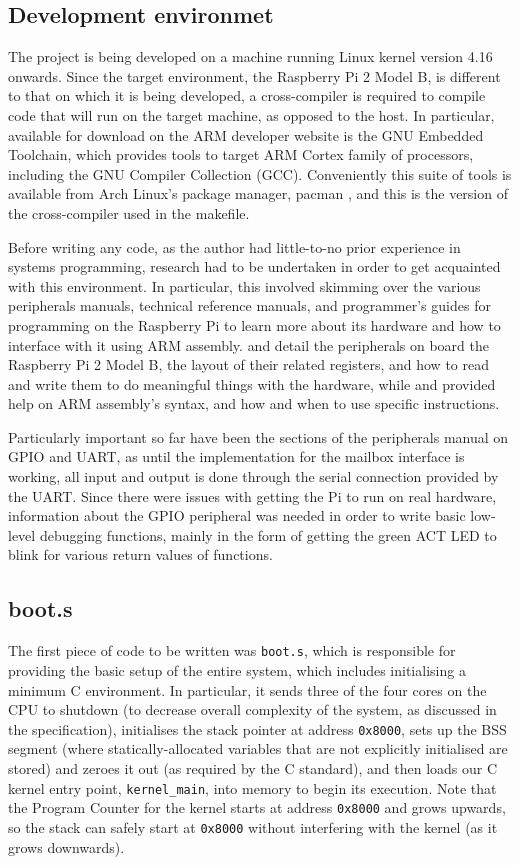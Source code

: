 \documentclass[10pt,a4paper]{article}
\newcommand{\code}[1]{\texttt{#1}}
\begin{document}
\subsection{Development environmet}
The project is being developed on a machine running Linux kernel version 4.16
onwards. Since the target environment, the Raspberry Pi 2 Model B, is different
to that on which it is being developed, a cross-compiler is required to compile
code that will run on the target machine, as opposed to the host. In particular,
available for download on the ARM developer website \cite{GNUtoolchain} is the
GNU Embedded Toolchain, which provides tools to target ARM Cortex family of
processors, including the GNU Compiler Collection (GCC). Conveniently this suite
of tools is available from Arch Linux's package manager, pacman \cite{pacman},
and this is the version of the cross-compiler used in the makefile.

Before writing any code, as the author had little-to-no prior experience in
systems programming, research had to be undertaken in order to get acquainted
with this environment. In particular, this involved skimming over the various
peripherals manuals, technical reference manuals, and programmer's guides for
programming on the Raspberry Pi to learn more about its hardware and how to
interface with it using ARM assembly. \cite{BCM2835} and \cite{BCM2836} detail the
peripherals on board the Raspberry Pi 2 Model B, the layout of their related
registers, and how to read and write them to do meaningful things with the
hardware, while \cite{TRM} and \cite{PG} provided help on ARM assembly's syntax,
and how and when to use specific instructions.

Particularly important so far have been the sections of the peripherals manual
on GPIO and UART, as until the implementation for the mailbox interface is
working, all input and output is done through the serial connection provided by
the UART.  Since there were issues with getting the Pi to run on real hardware,
information about the GPIO peripheral was needed in order to write basic
low-level debugging functions, mainly in the form of getting the green ACT LED
to blink for various return values of functions.

\subsection{boot.s}
The first piece of code to be written was \code{boot.s}, which is responsible
for providing the basic setup of the entire system, which includes initialising
a minimum C environment. In particular, it sends three of the four cores on the
CPU to shutdown (to decrease overall complexity of the system, as discussed in
the specification), initialises the stack pointer at address \code{0x8000}, sets
up the BSS segment (where statically-allocated variables that are not explicitly
initialised are stored) and zeroes it out (as required by the C standard), and
then loads our C kernel entry point, \code{kernel\_main}, into memory to begin
its execution. Note that the Program Counter for the kernel starts at address
\code{0x8000} and grows upwards, so the stack can safely start at \code{0x8000}
without interfering with the kernel (as it grows downwards).
\end{document}
